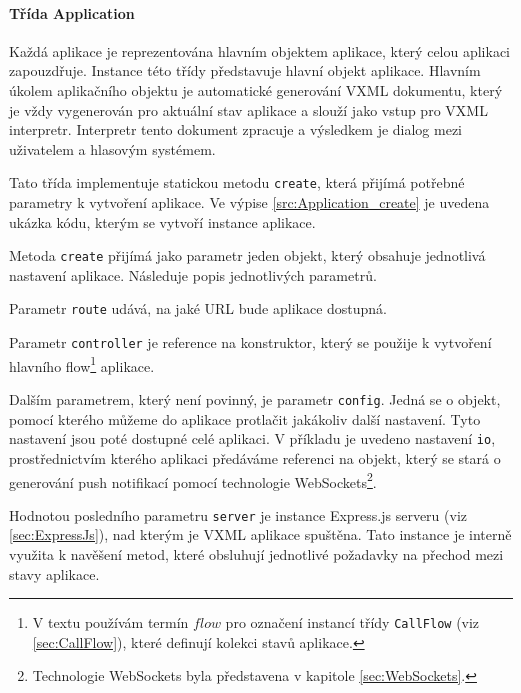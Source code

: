 \documentclass[ing,male,java,dept460,twoside]{diploma}						%
\begin{document}


\paragraph{Třída Application}
\label{sec:Application}
Každá aplikace je reprezentována hlavním objektem aplikace, který celou aplikaci zapouzdřuje. Instance této třídy představuje hlavní objekt aplikace. Hlavním úkolem aplikačního objektu je automatické generování VXML dokumentu, který je vždy vygenerován pro aktuální stav aplikace a slouží jako vstup pro VXML interpretr. Interpretr tento dokument zpracuje a výsledkem je dialog mezi uživatelem a hlasovým systémem.

Tato třída implementuje statickou metodu \texttt{create}, která přijímá potřebné parametry k vytvoření aplikace. Ve výpise \ref{src:Application_create} je uvedena ukázka kódu, kterým se vytvoří instance aplikace.



Metoda \texttt{create} přijímá jako parametr jeden objekt, který obsahuje jednotlivá nastavení aplikace. Následuje popis jednotlivých parametrů.

Parametr \texttt{route} udává, na jaké URL bude aplikace dostupná.

Parametr \texttt{controller} je reference na konstruktor, který se použije k vytvoření hlavního flow\footnote{V textu používám termín $flow$ pro označení instancí třídy \texttt{CallFlow} (viz \ref{sec:CallFlow}), které definují kolekci stavů aplikace.} aplikace.

Dalším parametrem, který není povinný, je parametr \texttt{config}. Jedná se o objekt, pomocí kterého můžeme do aplikace protlačit jakákoliv další nastavení. Tyto nastavení jsou poté dostupné celé aplikaci. V příkladu je uvedeno nastavení \texttt{io}, prostřednictvím kterého aplikaci předáváme referenci na objekt, který se stará o generování push notifikací pomocí technologie WebSockets\footnote{Technologie WebSockets byla představena v kapitole \ref{sec:WebSockets}.}.

Hodnotou posledního parametru \texttt{server} je instance Express.js serveru (viz \ref{sec:ExpressJs}), nad kterým je VXML aplikace spuštěna. Tato instance je interně využita k navěšení metod, které obsluhují jednotlivé požadavky na přechod mezi stavy aplikace.
\end{document}
